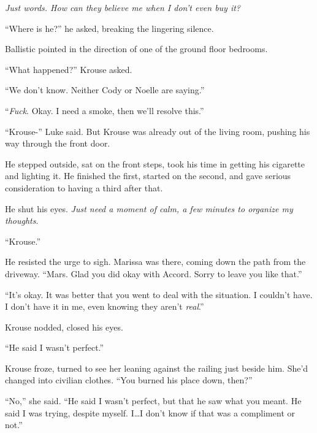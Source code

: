 \emph{Just words.  How can they believe me when I don't even buy it?}



``Where is he?'' he asked, breaking the lingering silence.



Ballistic pointed in the direction of one of the ground floor bedrooms.



``What happened?'' Krouse asked.



``We don't know.  Neither Cody or Noelle are saying.''



``\emph{Fuck}.  Okay.  I need a smoke, then we'll resolve this.''



``Krouse-'' Luke said.  But Krouse was already out of the living room, pushing his way through the front door.



He stepped outside, sat on the front steps, took his time in getting his cigarette and lighting it.  He finished the first, started on the second, and gave serious consideration to having a third after that.



He shut his eyes.  \emph{Just need a moment of calm, a few minutes to organize my thoughts}.



``Krouse.''



He resisted the urge to sigh.  Marissa was there, coming down the path from the driveway.  ``Mars.  Glad you did okay with Accord.  Sorry to leave you like that.''



``It's okay.  It was better that you went to deal with the situation.  I couldn't have.  I don't have it in me, even knowing they aren't \emph{real}.''



Krouse nodded, closed his eyes.



``He said I wasn't perfect.''



Krouse froze, turned to see her leaning against the railing just beside him.  She'd changed into civilian clothes.  ``You burned his place down, then?''



``No,'' she said.  ``He said I wasn't perfect, but that he saw what you meant.  He said I was trying, despite myself.  I\ldots I don't know if that was a compliment or not.''



